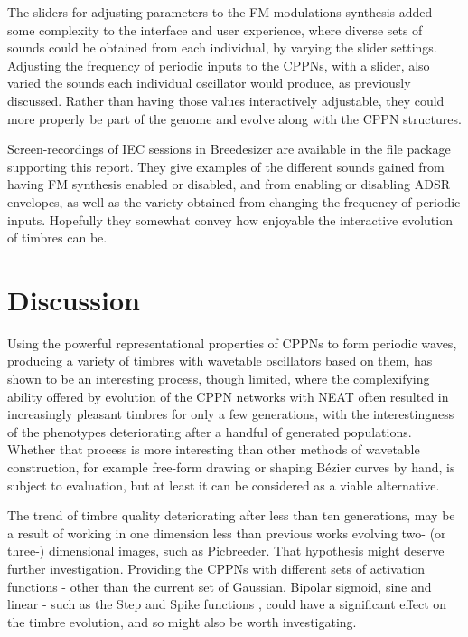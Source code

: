 \documentclass[conference]{IEEEtran}
\begin{document}
The sliders for adjusting parameters to the FM modulations synthesis added some complexity to the interface and user experience, where diverse sets of sounds could be obtained from each individual, by varying the slider settings.  Adjusting the frequency of periodic inputs to the CPPNs, with a slider, also varied the sounds each individual oscillator would produce, as previously discussed.  Rather than having those values interactively adjustable, they could more properly be part of the genome and evolve along with the CPPN structures.

Screen-recordings of IEC sessions in Breedesizer are available in the file package supporting this report.  They give examples of the different sounds gained from having FM synthesis enabled or disabled, and from enabling or disabling ADSR envelopes, as well as the variety obtained from changing the frequency of periodic inputs.  Hopefully they somewhat convey how enjoyable the interactive evolution of timbres can be.



\section{Discussion}

Using the powerful representational properties of CPPNs to form periodic waves, producing a variety of timbres with wavetable oscillators based on them, has shown to be an interesting process, though limited, where the complexifying ability offered by evolution of the CPPN networks with NEAT often resulted in increasingly pleasant timbres for only a few generations, with the interestingness of the phenotypes deteriorating after a handful of generated populations.  Whether that process is more interesting than other methods of wavetable construction, for example free-form drawing or shaping Bézier curves by hand, is subject to evaluation, but at least it can be considered as a viable alternative.

The trend of timbre quality deteriorating after less than ten generations, may be a result of working in one dimension less than previous works evolving two- (or three-) dimensional images, such as Picbreeder.  That hypothesis might deserve further investigation.  Providing the CPPNs with different sets of activation functions - other than the current set of Gaussian, Bipolar sigmoid, sine and linear - such as the Step and Spike functions \cite{CPPN-Activation-Functions}, could have a significant effect on the timbre evolution, and so might also be worth investigating.
\end{document}

